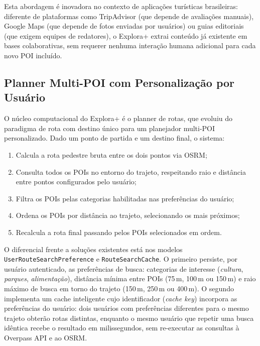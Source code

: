\documentclass[12pt, a4paper]{article}
\begin{document}
Esta abordagem \'e inovadora no contexto de aplica\c{c}\~oes tur\'isticas brasileiras: diferente de plataformas como TripAdvisor (que depende de avalia\c{c}\~oes manuais), Google Maps (que depende de fotos enviadas por usu\'arios) ou guias editoriais (que exigem equipes de redatores), o Explora+ extrai conte\'udo j\'a existente em bases colaborativas, sem requerer nenhuma intera\c{c}\~ao humana adicional para cada novo POI inclu\'ido.

\subsection{Planner Multi-POI com Personaliza\c{c}\~ao por Usu\'ario}

O n\'ucleo computacional do Explora+ \'e o planner de rotas, que evoluiu do paradigma de rota com destino \'unico para um planejador multi-POI personalizado. Dado um ponto de partida e um destino final, o sistema:

\begin{enumerate}
  \item Calcula a rota pedestre bruta entre os dois pontos via OSRM;
  \item Consulta todos os POIs no entorno do trajeto, respeitando raio e dist\^ancia entre pontos configurados pelo usu\'ario;
  \item Filtra os POIs pelas categorias habilitadas nas prefer\^encias do usu\'ario;
  \item Ordena os POIs por dist\^ancia ao trajeto, selecionando os mais pr\'oximos;
  \item Recalcula a rota final passando pelos POIs selecionados em ordem.
\end{enumerate}

{\sloppy
O diferencial frente a solu\c{c}\~oes existentes est\'a nos modelos \texttt{User\-Route\-Search\-Preference} e \texttt{Route\-Search\-Cache}. O primeiro persiste, por usu\'ario autenticado, as prefer\^encias de busca: categorias de interesse (\textit{cultura}, \textit{parques}, \textit{alimenta\c{c}\~ao}), dist\^ancia m\'inima entre POIs (75\,m, 100\,m ou 150\,m) e raio m\'aximo de busca em torno do trajeto (150\,m, 250\,m ou 400\,m). O segundo implementa um cache inteligente cujo identificador (\textit{cache key}) incorpora as prefer\^encias do usu\'ario: dois usu\'arios com prefer\^encias diferentes para o mesmo trajeto obter\~ao rotas distintas, enquanto o mesmo usu\'ario que repetir uma busca id\^entica recebe o resultado em milissegundos, sem re-executar as consultas \`a Overpass API e ao OSRM.
\par}
\end{document}
